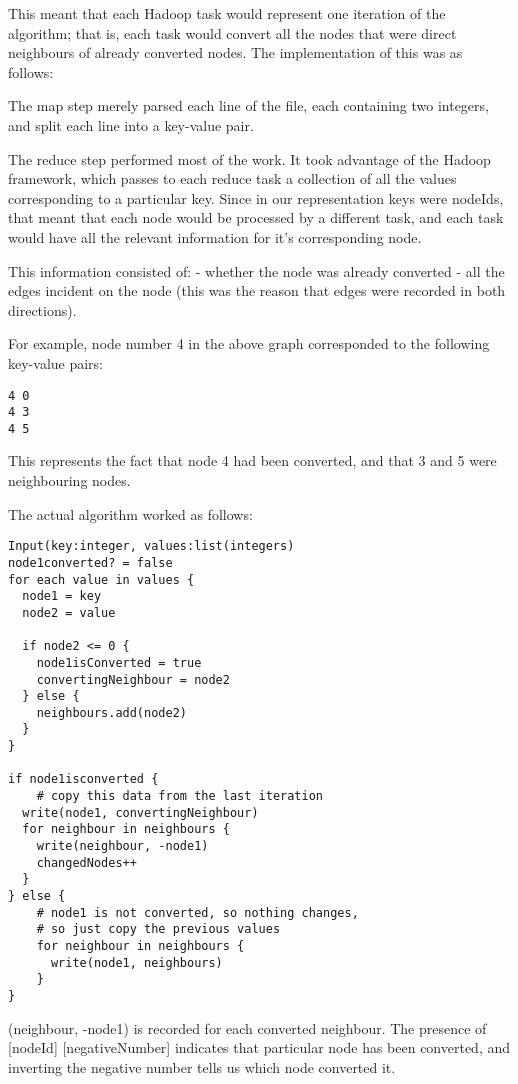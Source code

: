 This meant that each Hadoop task would represent one iteration of the algorithm; that is, each task would convert all the nodes that were direct neighbours of already converted nodes. The implementation of this was as follows:

The map step merely parsed each line of the file, each containing two integers, and split each line into a key-value pair.

The reduce step performed most of the work. It took advantage of the Hadoop framework, which passes to each reduce task a collection of all the values corresponding to a particular key. Since in our representation keys were nodeIds, that meant that each node would be processed by a different task, and each task would have all the relevant information for it's corresponding node.

This information consisted of:
- whether the node was already converted
- all the edges incident on the node (this was the reason that edges were recorded in both directions).

For example, node number 4 in the above graph corresponded to the following key-value pairs:

\begin{verbatim}
4 0
4 3
4 5
\end{verbatim}

This represents the fact that node 4 had been converted, and that 3 and 5 were neighbouring nodes.

The actual algorithm worked as follows:

\begin{verbatim}
Input(key:integer, values:list(integers)
node1converted? = false
for each value in values {
  node1 = key
  node2 = value

  if node2 <= 0 {
    node1isConverted = true
    convertingNeighbour = node2
  } else {
    neighbours.add(node2)
  }
}

if node1isconverted {
	# copy this data from the last iteration
  write(node1, convertingNeighbour) 
  for neighbour in neighbours {
    write(neighbour, -node1)
    changedNodes++
  } 
} else {
    # node1 is not converted, so nothing changes, 
    # so just copy the previous values
    for neighbour in neighbours {
      write(node1, neighbours)
    }            
}
\end{verbatim}

(neighbour, -node1) is recorded for each converted neighbour. The presence of [nodeId] [negativeNumber] indicates that particular node has been converted, and inverting the negative number tells us which node converted it.


